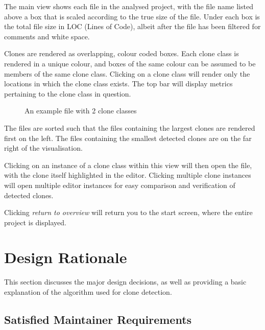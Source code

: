 \documentclass{article}
\begin{document}
The main view shows each file in the analysed project, with the file name listed above a box that is scaled according to the true size of the file. Under each box is the total file size in LOC (Lines of Code), albeit after the file has been filtered for comments and white space.

Clones are rendered as overlapping, colour coded boxes. Each clone class is rendered in a unique colour, and boxes of the same colour can be assumed to be members of the same clone class. Clicking on a clone class will render only the locations in which the clone class exists. The top bar will display metrics pertaining to the clone class in question.

\begin{figure}[h]
\centering
{}
\caption{An example file with 2 clone classes}
\label{fig:shot2}
\end{figure}

The files are sorted such that the files containing the largest clones are rendered first on the left. The files containing the smallest detected clones are on the far right of the visualisation.

Clicking on an instance of a clone class within this view will then open the file, with the clone itself highlighted in the editor. Clicking multiple clone instances will open multiple editor instances for easy comparison and verification of detected clones.

Clicking \textit{return to overview} will return you to the start screen, where the entire project is displayed.

\section{Design Rationale}

This section discusses the major design decisions, as well as providing a basic explanation of the algorithm used for clone detection.

\subsection{Satisfied Maintainer Requirements}
\end{document}
